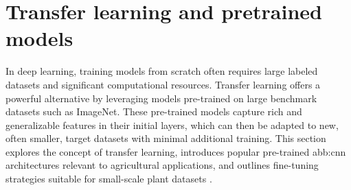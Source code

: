 






\section{Transfer learning and pretrained models}
In deep learning, training models from scratch often requires large labeled datasets and significant computational resources. Transfer learning offers a powerful alternative by leveraging models pre-trained on large benchmark datasets such as ImageNet. These pre-trained models capture rich and generalizable features in their initial layers, which can then be adapted to new, often smaller, target datasets with minimal additional training.
This section explores the concept of transfer learning, introduces popular pre-trained \gls{abb:cnn} architectures relevant to agricultural applications, and outlines fine-tuning strategies suitable for small-scale plant datasets \parencite{jouini2024wheat}.

